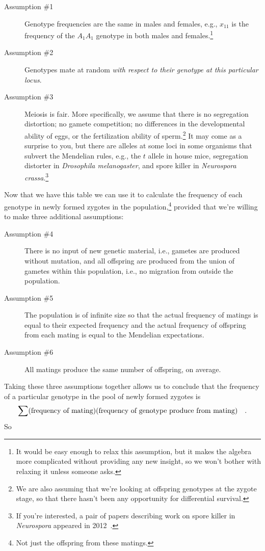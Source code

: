 \documentclass[12pt]{article}
\begin{document}
\begin{description}

\item[Assumption \#1] Genotype frequencies are the same in males and
  females, e.g., $x_{11}$ is the frequency of the $A_1A_1$ genotype in
  both males and females.\footnote{It would be easy enough to relax
    this assumption, but it makes the algebra more complicated without
    providing any new insight, so we won't bother with relaxing it
    unless someone asks.}

\item[Assumption \#2] Genotypes mate at random {\it with respect to
  their genotype at this particular locus}.

\item[Assumption \#3] Meiosis is fair. More specifically, we assume
  that there is no segregation distortion; no gamete competition; no
  differences in the developmental ability of eggs, or the
  fertilization ability of sperm.\footnote{We are also assuming that
    we're looking at offspring genotypes at the zygote stage, so that
    there hasn't been any opportunity for differential survival.} It
  may come as a surprise to you, but there are alleles at some loci in
  some organisms that subvert the Mendelian rules, e.g., the $t$
  allele in house mice, segregation distorter in {\it Drosophila
    melanogaster}, and spore killer in {\it Neurospora
    crassa\/}.\footnote{If you're interested, a pair of papers
    describing work on spore killer in {\it Neurospora\/} appeared in
    2012~\cite{Hammond-etal-2012,Saupe-2012}.}

\end{description}
Now that we have this table we can use it to calculate the frequency
of each genotype in newly formed zygotes in the
population,\footnote{Not just the offspring from these matings.}
provided that we're willing to make three additional assumptions:

\begin{description}

\item[Assumption \#4] There is no input of new genetic material, i.e.,
gametes are produced without mutation, and all offspring are produced
from the union of gametes within this population, i.e., no migration
from outside the population.

\item[Assumption \#5] The population is of infinite size so that the
actual frequency of matings is equal to their expected frequency and
the actual frequency of offspring from each mating is equal to the
Mendelian expectations.

\item[Assumption \#6] All matings produce the same number of
offspring, on average.

\end{description}
Taking these three assumptions together allows us to conclude that the
frequency of a particular genotype in the pool of newly formed zygotes
is
\[
\sum(\hbox{frequency of mating})(\hbox{frequency of genotype produce
  from mating}) \quad .
\]
So
\end{document}
